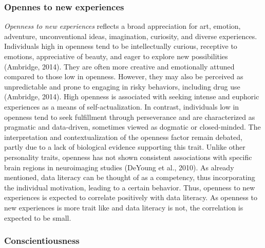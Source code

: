 \documentclass[
  12pt,
  a4paper,
  twoside]{article}
\begin{document}
\subsubsection{Opennes to new experiences}\label{opennes-to-new-experiences}

\emph{Openness to new experiences} reflects a broad appreciation for art, emotion, adventure, unconventional ideas, imagination, curiosity, and diverse experiences. Individuals high in openness tend to be intellectually curious, receptive to emotions, appreciative of beauty, and eager to explore new possibilities (Ambridge, 2014). They are often more creative and emotionally attuned compared to those low in openness. However, they may also be perceived as unpredictable and prone to engaging in risky behaviors, including drug use (Ambridge, 2014). High openness is associated with seeking intense and euphoric experiences as a means of self-actualization. In contrast, individuals low in openness tend to seek fulfillment through perseverance and are characterized as pragmatic and data-driven, sometimes viewed as dogmatic or closed-minded. The interpretation and contextualization of the openness factor remain debated, partly due to a lack of biological evidence supporting this trait. Unlike other personality traits, openness has not shown consistent associations with specific brain regions in neuroimaging studies (DeYoung et al., 2010). As already mentioned, data literacy can be thought of as a competency, thus incorporating the individual motivation, leading to a certain behavior. Thus, openness to new experiences is expected to correlate positively with data literacy. As openness to new experiences is more trait like and data literacy is not, the correlation is expected to be small.

\subsubsection{Conscientiousness}\label{conscientiousness}
\end{document}
